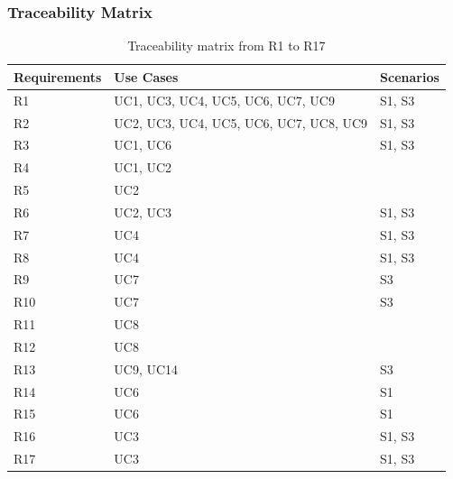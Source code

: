 



\subsubsection{Traceability Matrix}

\begin{table}[ht]
    \begin{center}
        \begin{tabular}{|p{2cm}|p{5cm}|p{3cm}|}
            \toprule Requirements & Use Cases & Scenarios \\
            \midrule
            R1 & UC1, UC3, UC4, UC5, UC6, UC7, UC9 & S1, S3 \\
            \midrule
            R2 & UC2, UC3, UC4, UC5, UC6, UC7, UC8, UC9 & S1, S3 \\
            \midrule
            R3 & UC1, UC6 & S1, S3 \\
            \midrule
            R4 & UC1, UC2 &  \\
            \midrule
            R5 & UC2 & \\
            \midrule
            R6 & UC2, UC3 & S1, S3 \\
            \midrule
            R7 & UC4 & S1, S3 \\
            \midrule
            R8 & UC4 & S1, S3 \\
            \midrule
            R9 & UC7 & S3 \\
            \midrule
            R10 & UC7 & S3 \\
            \midrule
            R11 & UC8 &  \\
            \midrule
            R12 & UC8 &  \\
            \midrule
            R13 & UC9, UC14 & S3 \\
            \midrule
            R14 & UC6 & S1 \\
            \midrule
            R15 & UC6 & S1 \\
            \midrule
            R16 & UC3 & S1, S3 \\
            \midrule
            R17 & UC3 & S1, S3 \\
            \bottomrule
            
        \end{tabular}
    \end{center}
    \caption{Traceability matrix from R1 to R17}
    
\end{table}
